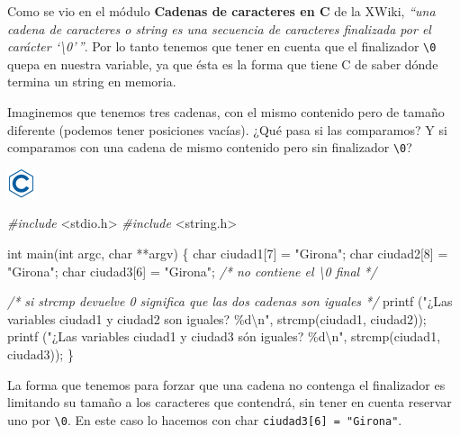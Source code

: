 \documentclass[
]{book}
\newenvironment{Shaded}{\begin{snugshade}}{\end{snugshade}}
\newcommand{\CommentTok}[1]{\textcolor[rgb]{0.56,0.35,0.01}{\textit{#1}}}
\newcommand{\DataTypeTok}[1]{\textcolor[rgb]{0.13,0.29,0.53}{#1}}
\newcommand{\DecValTok}[1]{\textcolor[rgb]{0.00,0.00,0.81}{#1}}
\newcommand{\ImportTok}[1]{#1}
\newcommand{\NormalTok}[1]{#1}
\newcommand{\PreprocessorTok}[1]{\textcolor[rgb]{0.56,0.35,0.01}{\textit{#1}}}
\newcommand{\SpecialCharTok}[1]{\textcolor[rgb]{0.00,0.00,0.00}{#1}}
\newcommand{\StringTok}[1]{\textcolor[rgb]{0.31,0.60,0.02}{#1}}
\begin{document}
Como se vio en el módulo \textbf{Cadenas de caracteres en C} de la XWiki, \emph{``una cadena de caracteres o string es una secuencia de caracteres finalizada por el carácter `\textbackslash0'\,''}. Por lo tanto tenemos que tener en cuenta que el finalizador \texttt{\textquotesingle{}\textbackslash{}0\textquotesingle{}} quepa en nuestra variable, ya que ésta es la forma que tiene C de saber dónde termina un string en memoria.

Imaginemos que tenemos tres cadenas, con el mismo contenido pero de tamaño diferente (podemos tener posiciones vacías). ¿Qué pasa si las comparamos? Y si comparamos con una cadena de mismo contenido pero sin finalizador \texttt{\textquotesingle{}\textbackslash{}0\textquotesingle{}}?

\includegraphics{./img/c.png}

\begin{Shaded}
\begin{Highlighting}[]
\PreprocessorTok{\#include }\ImportTok{\textless{}stdio.h\textgreater{}}
\PreprocessorTok{\#include }\ImportTok{\textless{}string.h\textgreater{}}

\DataTypeTok{int}\NormalTok{ main(}\DataTypeTok{int}\NormalTok{ argc, }\DataTypeTok{char}\NormalTok{ **argv) \{}
    \DataTypeTok{char}\NormalTok{ ciudad1[}\DecValTok{7}\NormalTok{] = }\StringTok{"Girona"}\NormalTok{;}
    \DataTypeTok{char}\NormalTok{ ciudad2[}\DecValTok{8}\NormalTok{] = }\StringTok{"Girona"}\NormalTok{;}
    \DataTypeTok{char}\NormalTok{ ciudad3[}\DecValTok{6}\NormalTok{] = }\StringTok{"Girona"}\NormalTok{; }\CommentTok{/* no contiene el \textquotesingle{}\textbackslash{}0\textquotesingle{} final */}

    \CommentTok{/* si strcmp devuelve 0 significa que las dos cadenas son iguales */}
\NormalTok{    printf (}\StringTok{"¿Las variables ciudad1 y ciudad2 son iguales? \%d}\SpecialCharTok{\textbackslash{}n}\StringTok{"}\NormalTok{, strcmp(ciudad1, ciudad2));}
\NormalTok{    printf (}\StringTok{"¿Las variables ciudad1 y ciudad3 són iguales? \%d}\SpecialCharTok{\textbackslash{}n}\StringTok{"}\NormalTok{, strcmp(ciudad1, ciudad3));}
\NormalTok{\}}
\end{Highlighting}
\end{Shaded}

La forma que tenemos para forzar que una cadena no contenga el finalizador es limitando su tamaño a los caracteres que contendrá, sin tener en cuenta reservar uno por \texttt{\textquotesingle{}\textbackslash{}0\textquotesingle{}}. En este caso lo hacemos con char \texttt{ciudad3{[}6{]}\ =\ "Girona"}.
\end{document}
